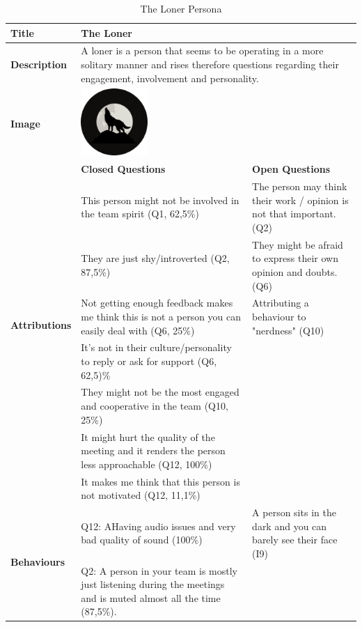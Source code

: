 \begin{longtable}[ht]{ p{}  p{} p{} }
\caption{The Loner Persona}
\label{tab:theLoner}\\
\hline
\textbf{Title} & The Loner \\
    \hline
   \textbf{Description} & \multicolumn{2}{p{.80\textwidth}}{A loner is a person that seems to be operating in a more solitary manner and rises therefore questions regarding their engagement, involvement and personality.} \\
\hline
   \textbf{Image} &  \includegraphics[valign=t, width=1in, margin=0pt 3pt 0pt 3pt]{figures/Loner.png} \\   
   \hline
    & \textbf{Closed Questions} & \textbf{Open Questions} \\
    \hline
    \multirow{6}{4cm}{\textbf{Attributions}}  & This person might not be involved in the team spirit (Q1, 62,5\%) & The person may think their work / opinion is not that important. (Q2)  \\
     & They are just shy/introverted (Q2, 87,5\%) & They might be afraid to express their own opinion and doubts. (Q6) \\
     & Not getting enough feedback makes me think this is not a person you can easily deal with (Q6, 25\%) & Attributing a behaviour to "nerdness" (Q10) \\
     & It’s not in their culture/personality to reply or ask for support  (Q6, 62,5)\%\\
 	 & They might not be the most engaged and cooperative in the team (Q10, 25\%) \\
 	 & It might hurt the quality of the meeting and it renders the person less approachable (Q12, 100\%)\\
 	 & It makes me think that this person is not motivated (Q12, 11,1\%) \\
    \hline
    \hline
    \multirow{4}{4cm}{\textbf{Behaviours}}  & Q12: AHaving audio issues and very bad quality of sound (100\%) & A person sits in the dark and you can barely see their face (I9) \\
     & Q2: A person in your team is mostly just listening during the meetings and is muted almost all the time (87,5\%). \\

\end{longtable}
